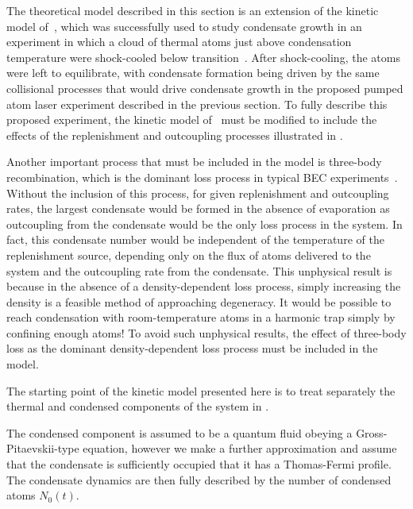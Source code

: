 The theoretical model described in this section is an extension of the kinetic model of~\citet{Bijlsma:2000}, which was successfully used to study condensate growth in an experiment in which a cloud of thermal atoms just above condensation temperature were shock-cooled below transition~\citep{Miesner:1998}.  After shock-cooling, the atoms were left to equilibrate, with condensate formation being driven by the same collisional processes that would drive condensate growth in the proposed pumped atom laser experiment described in the previous section.  To fully describe this proposed experiment, the kinetic model of~\citeauthor{Bijlsma:2000} must be modified to include the effects of the replenishment and outcoupling processes illustrated in . 

Another important process that must be included in the model is three-body recombination, which is the dominant loss process in typical BEC experiments~\citep{Burt:1997fk,Soding:1999}. Without the inclusion of this process, for given replenishment and outcoupling rates, the largest condensate would be formed in the absence of evaporation as outcoupling from the condensate would be the only loss process in the system. In fact, this condensate number would be independent of the temperature of the replenishment source, depending only on the flux of atoms delivered to the system and the outcoupling rate from the condensate. This unphysical result is because in the absence of a density-dependent loss process, simply increasing the density is a feasible method of approaching degeneracy. It would be possible to reach condensation with room-temperature atoms in a harmonic trap simply by confining enough atoms! To avoid such unphysical results, the effect of three-body loss as the dominant density-dependent loss process must be included in the model.

\parasep

The starting point of the kinetic model presented here is to treat separately the thermal and condensed components of the system in .

The condensed component is assumed to be a quantum fluid obeying a Gross-Pitaevskii-type equation, however we make a further approximation and assume that the condensate is sufficiently occupied that it has a Thomas-Fermi profile.  The condensate dynamics are then fully described by the number of condensed atoms $N_0(t)$.

